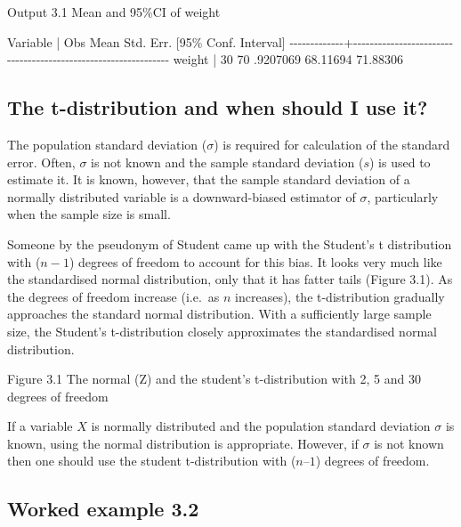 \documentclass[
]{memoir}
\newenvironment{Shaded}{\begin{snugshade}}{\end{snugshade}}
\newcommand{\NormalTok}[1]{#1}
\begin{document}
Output 3.1 Mean and 95\%CI of weight

\begin{Shaded}
\begin{Highlighting}[]
\NormalTok{    Variable |        Obs        Mean    Std. Err.       [95\% Conf. Interval]}
\NormalTok{{-}{-}{-}{-}{-}{-}{-}{-}{-}{-}{-}{-}{-}+{-}{-}{-}{-}{-}{-}{-}{-}{-}{-}{-}{-}{-}{-}{-}{-}{-}{-}{-}{-}{-}{-}{-}{-}{-}{-}{-}{-}{-}{-}{-}{-}{-}{-}{-}{-}{-}{-}{-}{-}{-}{-}{-}{-}{-}{-}{-}{-}{-}{-}{-}{-}{-}{-}{-}{-}{-}{-}{-}{-}{-}{-}{-}}
\NormalTok{      weight |         30          70    .9207069        68.11694    71.88306}
\end{Highlighting}
\end{Shaded}

\hypertarget{the-t-distribution-and-when-should-i-use-it}{%
\subsection{The t-distribution and when should I use it?}\label{the-t-distribution-and-when-should-i-use-it}}

The population standard deviation (\(\sigma\)) is required for calculation of the standard error. Often, \(\sigma\) is not known and the sample standard deviation (\(s\)) is used to estimate it. It is known, however, that the sample standard deviation of a normally distributed variable is a downward-biased estimator of \(\sigma\), particularly when the sample size is small.

Someone by the pseudonym of Student came up with the Student's t distribution with (\(n-1\)) degrees of freedom to account for this bias. It looks very much like the standardised normal distribution, only that it has fatter tails (Figure 3.1). As the degrees of freedom increase (i.e.~as \(n\) increases), the t-distribution gradually approaches the standard normal distribution. With a sufficiently large sample size, the Student's t-distribution closely approximates the standardised normal distribution.

Figure 3.1 The normal (Z) and the student's t-distribution with 2, 5 and 30 degrees of freedom

If a variable \(X\) is normally distributed and the population standard deviation \(\sigma\) is known, using the normal distribution is appropriate. However, if \(\sigma\) is not known then one should use the student t-distribution with (\(n – 1\)) degrees of freedom.

\hypertarget{worked-example-3.2}{%
\subsection{Worked example 3.2}\label{worked-example-3.2}}
\end{document}
